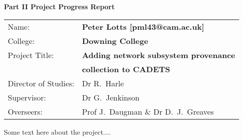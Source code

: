 \documentclass[a4paper,12pt,twoside,openright]{report}
\begin{document}
	{\LARGE \textbf{Part II Project Progress Report}}
	
	\vspace*{10mm}
	
	{\large
		\begin{tabular}{ll}
			Name:               & \bf Peter Lotts [pml43@cam.ac.uk]  	\\
			College:            & \bf Downing College               	\\
			Project Title:      & \bf Adding network subsystem provenance \\
								& \bf collection to CADETS 				\\
			Director of Studies:& Dr R.~Harle                   	 	\\
			Supervisor:         & Dr G.~Jenkinson                    	\\ 
			Overseers:         	& Prof J.~Daugman \& Dr D.~J.~Greaves  	\\
		\end{tabular}
	}

	\vspace*{10mm}

	Some text here about the project....
	
\end{document}
